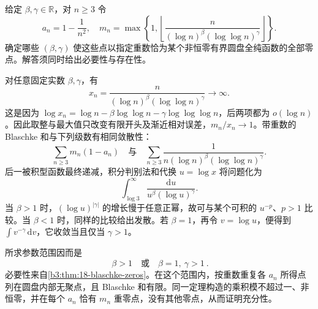 \begin{exercise}[重数的临界可和性]\label{b3:ex:18-draft-03}
给定 \(\beta,\gamma\in\mathbb R\)，对 \(n\ge3\) 令
\[
 a_n=1-\frac1{n^2},\quad
 m_n=\max\left\{1,
 \left\lfloor\frac{n}{(\log n)^\beta(\log\log n)^\gamma}\right\rfloor\right\}.
\]
确定哪些 \((\beta,\gamma)\) 使这些点以指定重数恰为某个非恒零有界圆盘全纯函数的全部零点。解答须同时给出必要性与存在性。
\end{exercise}
\begin{solution}
对任意固定实数 \(\beta,\gamma\)，有
\[
 x_n=\frac{n}{(\log n)^\beta(\log\log n)^\gamma}\longrightarrow\infty.
\]
这是因为 \(\log x_n=\log n-\beta\log\log n-\gamma\log\log\log n\)，后两项都为 \(o(\log n)\)。因此取整与最大值只改变有限开头及渐近相对误差，\(m_n/x_n\to1\)。带重数的 Blaschke 和与下列级数有相同敛散性：
\[
 \sum_{n\ge3}m_n(1-a_n)
 \quad\text{与}\quad
 \sum_{n\ge3}\frac1{n(\log n)^\beta(\log\log n)^\gamma}.
\]
后一被积型函数最终递减，积分判别法和代换 \(u=\log x\) 将问题化为
\[
 \int_{\log3}^\infty\frac{\mathrm du}{u^\beta(\log u)^\gamma}.
\]
当 \(\beta>1\) 时，\((\log u)^{|\gamma|}\) 的增长慢于任意正幂，故可与某个可积的 \(u^{-p}\)、\(p>1\) 比较。当 \(\beta<1\) 时，同样的比较给出发散。若 \(\beta=1\)，再令 \(v=\log u\)，便得到 \(\int v^{-\gamma}\,\mathrm dv\)，它收敛当且仅当 \(\gamma>1\)。

所求参数范围因而是
\[
 \boxed{\ \beta>1\quad\text{或}\quad\beta=1,\ \gamma>1\ }.
\]
必要性来自\cref{b3:thm:18-blaschke-zeros}。在这个范围内，按重数重复各 \(a_n\) 所得点列在圆盘内部无聚点，且 Blaschke 和有限。同一定理构造的乘积模不超过一、非恒零，并在每个 \(a_n\) 恰有 \(m_n\) 重零点，没有其他零点，从而证明充分性。
\end{solution}

